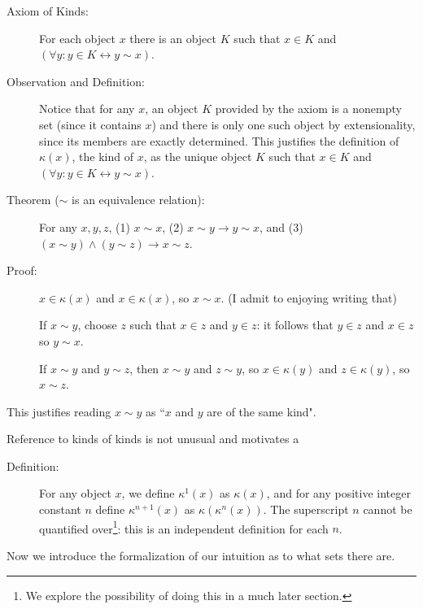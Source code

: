 \documentclass[12pt]{article}
\begin{document}
\begin{description}

\item[Axiom of Kinds:]  For each object $x$ there is an object $K$ such that $x \in K$ and $(\forall y:y \in K \leftrightarrow y \sim x)$.

\item[Observation and Definition:]  Notice that for any $x$, an object $K$ provided by the axiom is a nonempty set (since it contains $x$)
and there is only one such object by extensionality, since its members are exactly determined.  This justifies the definition of $\kappa(x)$, the kind of $x$, as the unique object $K$ such that $x \in K$ and $(\forall y:y \in K \leftrightarrow y \sim x)$.

\item[Theorem ($\sim$ is an equivalence relation):]  For any $x,y,z$, (1) $x \sim x$, \newline (2) $x \sim y \rightarrow y \sim x$, and (3) $(x \sim y) \wedge (y \sim z) \rightarrow x \sim z$.

\item[Proof:]  $x \in \kappa(x)$ and $x \in \kappa(x)$, so $x \sim x$.  (I admit to enjoying writing that)

If $x \sim y$, choose $z$ such that $x \in z$ and $y \in z$:  it follows that $y \in z$ and $x \in z$ so $y \sim x$.

If $x \sim y$ and $y \sim z$, then $x \sim y$ and $z \sim y$, so $x \in \kappa(y)$ and $z \in \kappa(y)$, so $x \sim z$.

\end{description}

This justifies reading $x \sim y$ as ``$x$ and $y$ are of the same kind".

Reference to kinds of kinds is not unusual and motivates a
\begin{description}

\item[Definition:]  For any object $x$, we define $\kappa^1(x)$ as $\kappa(x)$,
and for any positive integer constant $n$ define $\kappa^{n+1}(x)$ as $\kappa(\kappa^n(x))$.  The superscript $n$ cannot be quantified over\footnote{We explore the possibility of doing this in a much later section.}:  this is an independent definition for each $n$.

\end{description}

Now we introduce the formalization of our intuition as to what sets there are.
\end{document}
